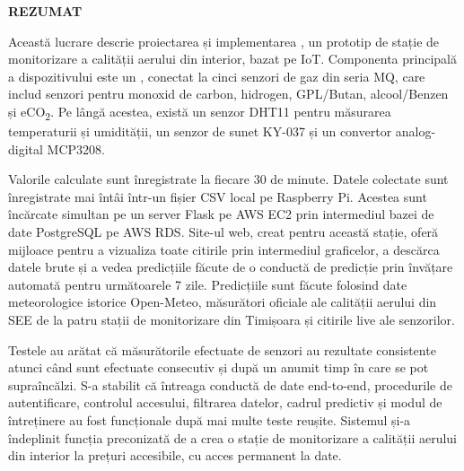 
\thispagestyle{plain}

\vspace*{3\baselineskip}

\begin{center}
{\fontsize{20}{24}\selectfont\textbf{\MakeUppercase{Rezumat}}}
\end{center}

\vspace{2\baselineskip}

Această lucrare descrie proiectarea și implementarea \airnest{}, un prototip de stație de
monitorizare a calității aerului din interior, bazat pe IoT. Componenta principală a
dispozitivului este un \RPi{}, conectat la cinci senzori de gaz din seria MQ, care includ
senzori pentru monoxid de carbon, hidrogen, GPL/Butan, alcool/Benzen și eCO\textsubscript{2}.
Pe lângă acestea, există un senzor DHT11 pentru măsurarea temperaturii și umidității, un
senzor de sunet KY-037 și un convertor analog-digital MCP3208.

Valorile calculate sunt înregistrate la fiecare 30 de minute. Datele colectate sunt înregistrate
mai întâi într-un fișier CSV local pe Raspberry Pi. Acestea sunt încărcate simultan pe un server
Flask pe AWS EC2 prin intermediul bazei de date PostgreSQL pe AWS RDS. Site-ul web, creat pentru
această stație, oferă mijloace pentru a vizualiza toate citirile prin intermediul graficelor,
a descărca datele brute și a vedea predicțiile făcute de o conductă de predicție prin
învățare automată pentru următoarele 7 zile. Predicțiile sunt făcute folosind date
meteorologice istorice Open-Meteo, măsurători oficiale ale calității aerului din SEE de la
patru stații de monitorizare din Timișoara și citirile live ale senzorilor.

Testele au arătat că măsurătorile efectuate de senzori au rezultate consistente atunci când sunt
efectuate consecutiv și după un anumit timp în care se pot supraîncălzi. S-a stabilit că
întreaga conductă de date end-to-end, procedurile de autentificare, controlul accesului,
filtrarea datelor, cadrul predictiv și modul de întreținere au fost funcționale după mai
multe teste reușite. Sistemul și-a îndeplinit funcția preconizată de a crea o stație de
monitorizare a calității aerului din interior la prețuri accesibile, cu acces permanent la date.

